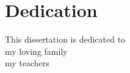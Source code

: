 \documentclass[12pt, letterpaper]{report}   %
\begin{document}


\maketitle

\copyrightpage

\approvalpage

\section*{Dedication}
\begin{flushright}
This dissertation is dedicated to \\
my loving family \\ 
my teachers
\end{flushright}


\newpage
{}


\newpage
{}



\end{document}
